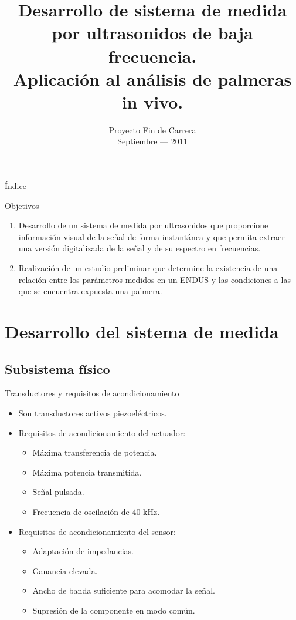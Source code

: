 \documentclass[utf8, compress]			{beamer}
\title[ENDUS: Sistema de medida y aplicación en palmeras in vivo.]{
    Desarrollo de sistema de medida por ultrasonidos de baja frecuencia. \\
    Aplicación al análisis de palmeras in vivo.
}
\author[José Ramón Gisbert Valls]{
    \vbox{
	\makebox[\director][r]{AUTOR: José Ramón Gisbert Valls}
	\makebox[\director][r]{DIRECTOR: Alberto Rodríguez Martínez}
    }
}
\institute[Universidad Miguel Hernández de Elche]{
    Universidad Miguel Hernández de Elche \medskip\par
    Escuela Politécnica Superior de Elche
}
\date[Septiembre --- 2011]{
    Proyecto Fin de Carrera \\
    Septiembre --- 2011
}
\begin{document}
\frame[plain]{\titlepage}

\begin{frame}{Índice}
    \tableofcontents
\end{frame}

\begin{frame}{Objetivos}
    \begin{enumerate}
	\item Desarrollo de un \alert{sistema de medida por ultrasonidos}
	    que proporcione información visual de la señal de forma
	    instantánea y que permita extraer una versión digitalizada de
	    la señal y de su espectro en frecuencias.
	\item Realización de un \alert{estudio preliminar} que determine la
	    existencia de una relación entre los parámetros medidos en un
	    ENDUS y las condiciones a las que se encuentra expuesta una
	    palmera.
    \end{enumerate}
\end{frame}


\section{Desarrollo del sistema de medida}

\subsection{Subsistema físico}

\begin{frame}{Transductores y requisitos de acondicionamiento}
    \begin{itemize}
	\item Son transductores activos piezoeléctricos.
	\item Requisitos de acondicionamiento del actuador:
	    \begin{itemize}
		\item Máxima transferencia de potencia.
		\item Máxima potencia transmitida.
		\item Señal pulsada.
		\item Frecuencia de oscilación de 40 kHz.
	    \end{itemize}
	\item Requisitos de acondicionamiento del sensor:
	    \begin{itemize}
		\item Adaptación de impedancias.
		\item Ganancia elevada.
		\item Ancho de banda suficiente para acomodar la señal.
		\item Supresión de la componente en modo común.
	    \end{itemize}
    \end{itemize}
\end{frame}
\end{document}

